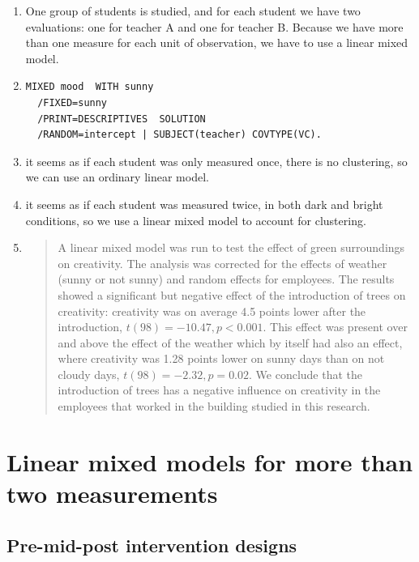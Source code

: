 \documentclass[]{book}\usepackage[]{graphicx}\usepackage[]{color}
\begin{document}
\begin{enumerate}
\item  One group of students is studied, and for each student we have two evaluations: one for teacher A and one for teacher B. Because we have more than one measure for each unit of observation, we have to use a linear mixed model. 

\item 

\begin{verbatim}
MIXED mood  WITH sunny
  /FIXED=sunny
  /PRINT=DESCRIPTIVES  SOLUTION
  /RANDOM=intercept | SUBJECT(teacher) COVTYPE(VC).
\end{verbatim}

\item  it seems as if each student was only measured once, there is no clustering, so we can use an ordinary linear model.

\item  it seems as if each student was measured twice, in both dark and bright conditions, so we use a linear mixed model to account for clustering.

\item  
\begin{quotation}

A linear mixed model was run to test the effect of green surroundings on creativity. The analysis was corrected for the effects of weather (sunny or not sunny) and random effects for employees. The results showed a significant but negative effect of the introduction of trees on creativity: creativity was on average 4.5 points lower after the introduction, $t(98)=-10.47, p < 0.001$. This effect was present over and above the effect of the weather which by itself had also an effect, where creativity was 1.28 points lower on sunny days than on not cloudy days, $t(98)=-2.32, p=0.02$. We conclude that the introduction of trees has a negative influence on creativity in the employees that worked in the building studied in this research. 

\end{quotation}

\end{enumerate}



\chapter{Linear mixed models for more than two measurements}\label{chap:premidpost}

\section{Pre-mid-post intervention designs}
\end{document}
